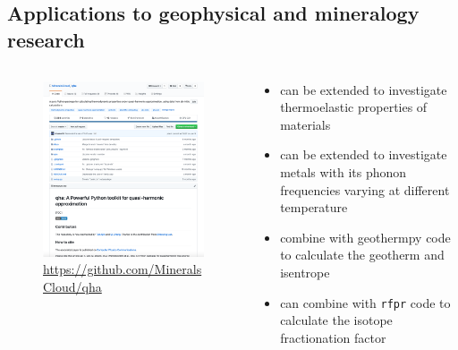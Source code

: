 \documentclass[13pt,aspectratio=169]{beamer}
\begin{document}
\subsection{Applications to geophysical and mineralogy research}
\begin{frame}{\subsecname}
	\begin{columns}
		\begin{column}{0.45\textwidth}
			\begin{figure}
				\includegraphics[height=0.8\textheight]{images/website}%
				\captionsetup{labelformat=empty}
				\caption{\scriptsize\url{https://github.com/MineralsCloud/qha}}
			\end{figure}
		\end{column}

		\begin{column}{0.45\textwidth}
			\begin{itemize}
				\item can be extended to investigate thermoelastic properties of materials \cite{Wu:2011ea}
				\item can be extended to investigate metals with its phonon frequencies varying at different temperature
				\item combine with geothermpy code to calculate the geotherm and isentrope \cite{Cardona:2017dd}
				\item can combine with \texttt{rfpr} code to calculate the isotope fractionation factor
			\end{itemize}
		\end{column}
	\end{columns}
\end{frame}
\end{document}
